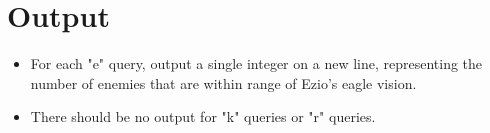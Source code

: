 \section*{Output}

\begin{itemize}
    \item For each "e" query, output a single integer on a new line, representing the number of enemies that are within range of Ezio's eagle vision.
    \item There should be no output for "k" queries or "r" queries. 
\end{itemize}